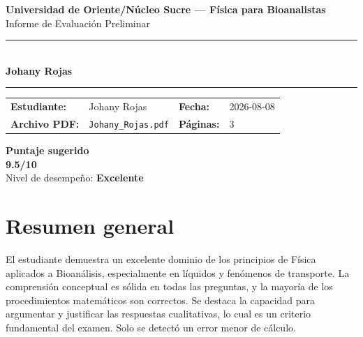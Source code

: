 \documentclass[11pt,a4paper]{article}
\begin{document}
\begin{center}
  {\Large\bfseries\color{azulTitulo} Universidad de Oriente/Núcleo Sucre --- Física para Bioanalistas}\\[4pt]
  {\large Informe de Evaluación Preliminar}\\[12pt]
  \rule{\linewidth}{1.2pt}\\[6pt]
  {\LARGE\bfseries Johany Rojas}\\[4pt]
  \rule{\linewidth}{0.6pt}
\end{center}

\vspace{4pt}
\begin{tcolorbox}[cajaTitulo, title=Datos del informe]
\begin{tabular}{@{}llll@{}}
  \textbf{Estudiante:}  & Johany Rojas  &
  \textbf{Fecha:}       & 2026-08-08 \\[4pt]
  \textbf{Archivo PDF:} & \texttt{Johany\_Rojas.pdf}  &
  \textbf{Páginas:}     & 3 \\
\end{tabular}
\end{tcolorbox}

\vspace{6pt}
\begin{center}
  \begin{tcolorbox}[
    enhanced,
    colback=white, colframe=desempeno_excelente,
    width=0.62\linewidth,
    boxrule=2pt,
    halign=center, valign=center,
    top=8pt, bottom=8pt,
  ]
    \centering
    {\large\bfseries Puntaje sugerido}\\[6pt]
    {\Huge\bfseries\color{desempeno_excelente} 9.5/10}\\[6pt]
    {\large Nivel de desempeño: \textbf{\color{desempeno_excelente} Excelente}}
  \end{tcolorbox}
\end{center}

\section*{Resumen general}
El estudiante demuestra un excelente dominio de los principios de Física aplicados a Bioanálisis, especialmente en líquidos y fenómenos de transporte. La comprensión conceptual es sólida en todas las preguntas, y la mayoría de los procedimientos matemáticos son correctos. Se destaca la capacidad para argumentar y justificar las respuestas cualitativas, lo cual es un criterio fundamental del examen. Solo se detectó un error menor de cálculo.
\end{document}
